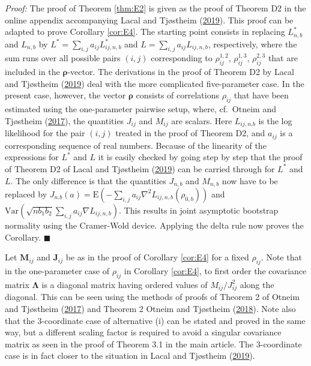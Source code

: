 \documentclass[
  12pt,
  letterpaper]{article}
\numberwithin{equation}{section}
\newcommand{\M}{\bm{M}}
\newcommand{\J}{\bm{J}}
\newcommand{\frho}{\bm{\rho}}
\newcommand{\fLambda}{\bm{\Lambda}}
\newcommand{\E}{\textrm{E}}
\newcommand{\Var}{\textrm{Var}}
\begin{document}
\emph{Proof:} The proof of Theorem \ref{thm:E2} is given as the proof of Theorem D2 in the online appendix accompanying Lacal and Tjøstheim (\protect\hyperlink{ref-lacal2018estimating}{2019}). This proof can be adapted to prove Corollary \ref{cor:E4}. The starting point consists in replacing \(L_{n,b}^*\) and \(L_{n,b}\) by \(L^* = \sum_{i,j} a_{ij}L_{ij,n,b}^*\) and \(L = \sum_{i,j}a_{ij}L_{ij,n,b}\), respectively, where the sum runs over all possible pairs \((i,j)\) corresponding to \(\rho_{ij}^{1,2}\), \(\rho_{ij}^{1,3}\), \(\rho_{ij}^{2,3}\) that are included in the \(\frho\)-vector. The derivations in the proof of Theorem D2 by Lacal and Tjøstheim (\protect\hyperlink{ref-lacal2018estimating}{2019}) deal with the more complicated five-parameter case. In the present case, however, the vector \(\frho\) consists of correlations \(\rho_{ij}\) that have been estimated using the one-parameter pairwise setup, where, cf.~Otneim and Tjøstheim (\protect\hyperlink{ref-otneim2017locally}{2017}), the quantities \(J_{ij}\) and \(M_{ij}\) are scalars. Here \(L_{ij,n.b}\) is the log likelihood for the pair \((i,j)\) treated in the proof of Theorem D2, and \(a_{ij}\) is a corresponding sequence of real numbers. Because of the linearity of the expressions for \(L^*\) and \(L\) it is easily checked by going step by step that the proof of Theorem D2 of Lacal and Tjøstheim (\protect\hyperlink{ref-lacal2018estimating}{2019}) can be carried through for \(L^*\) and \(L\). The only difference is that the quantities \(J_{n,b}\) and \(M_{n,b}\) now have to be replaced by \(J_{n.b}(a) = \E(-\sum_{i,j}a_{ij}\nabla^2 L_{ij,n,b}(\rho_{0,b}))\) and \(\Var(\sqrt{nb_1b_2}\sum_{i,j} a_{ij}\nabla L_{ij,n,b})\). This results in joint asymptotic bootstrap normality using the Cramer-Wold device. Applying the delta rule now proves the Corollary. \(\blacksquare\)

Let \(\M_{ij}\) and \(\J_{ij}\) be as in the proof of Corollary \ref{cor:E4} for a fixed \(\rho_{ij}\). Note that in the one-parameter case of \(\rho_{ij}\) in Corollary \ref{cor:E4}, to first order the covariance matrix \(\fLambda\) is a diagonal matrix having ordered values of \(M_{ij}/J_{ij}^2\) along the diagonal. This can be seen using the methods of proofs of Theorem 2 of Otneim and Tjøstheim (\protect\hyperlink{ref-otneim2017locally}{2017}) and Theorem 2 Otneim and Tjøstheim (\protect\hyperlink{ref-otneim2017conditional}{2018}). Note also that the 3-coordinate case of alternative (i) can be stated and proved in the same way, but a different scaling factor is required to avoid a singular covariance matrix as seen in the proof of Theorem 3.1 in the main article. The 3-coordinate case is in fact closer to the situation in Lacal and Tjøstheim (\protect\hyperlink{ref-lacal2018estimating}{2019}).
\end{document}
